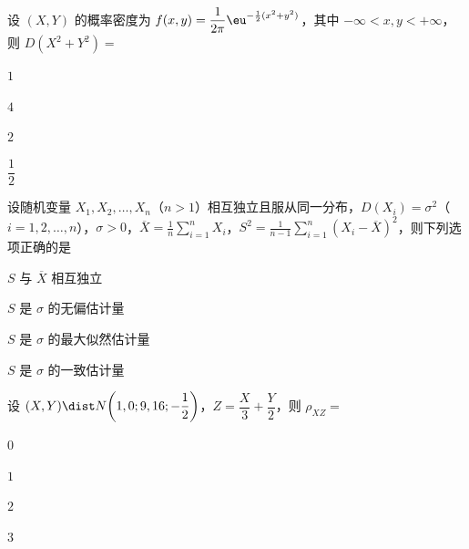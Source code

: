 \begin{question}[index=8]
设 $(X,Y)$ 的概率密度为 $f(x,y)=\dfrac1{2\pi}\eu^{-\frac12(x^2+y^2)}$，其中 $-\infty<x,y<+\infty$，则 \mbox{$D(X^2+Y^2)=$}
\begin{choices}[columns=4]
\item $1$
\item $4$
\item $2$
\item $\dfrac12$
\end{choices}
\end{question}
\QuestionBreak

\begin{question}[index=9]
设随机变量 $X_1,X_2,\ldots,X_n$（$n>1$）相互独立且服从同一分布，$D(X_i)=\sigma^2$（$i=1,2,\ldots,n$），$\sigma>0$，$\displaystyle\overline X=\frac1n\sum_{i=1}^nX_i$，$\displaystyle S^2=\frac1{n-1}\sum_{i=1}^n(X_i-\overline X)^2$，则下列选项正确的是
\begin{choices}[columns=2]
\item $S$ 与 $\overline X$ 相互独立
\item $S$ 是 $\sigma$ 的无偏估计量
\item $S$ 是 $\sigma$ 的最大似然估计量
\item $S$ 是 $\sigma$ 的一致估计量
\end{choices}
\end{question}
\QuestionBreak

\begin{question}[index=10]
设 $(X,Y)\dist N\!\left(1,0;9,16;-\dfrac12\right)$，$Z=\dfrac X3+\dfrac Y2$，则 $\rho_{XZ}=$
\begin{choices}[columns=4]
\item $0$
\item $1$
\item $2$
\item $3$
\end{choices}
\end{question}
